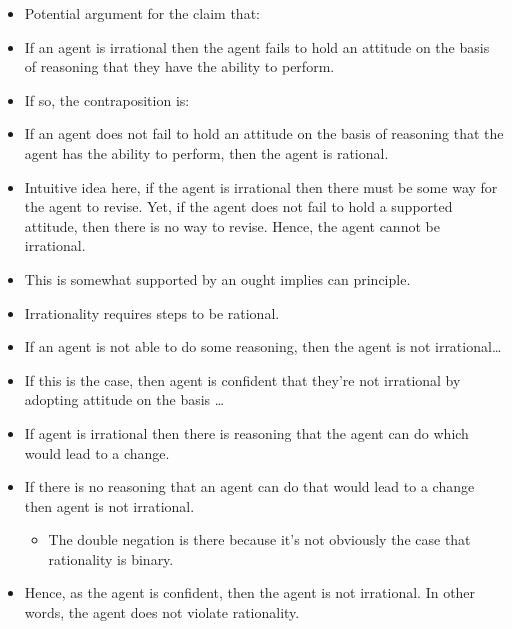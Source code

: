\documentclass[10pt]{article}
\begin{document}
\begin{itemize}
\item Potential argument for the claim that:
\item If an agent is irrational then the agent fails to hold an attitude on the basis of reasoning that they have the ability to perform.
\item If so, the contraposition is:
\item If an agent does not fail to hold an attitude on the basis of reasoning that the agent has the ability to perform, then the agent is rational.
\item Intuitive idea here, if the agent is irrational then there must be some way for the agent to revise.
  Yet, if the agent does not fail to hold a supported attitude, then there is no way to revise.
  Hence, the agent cannot be irrational.
\item This is somewhat supported by an ought implies can principle.
\item Irrationality requires steps to be rational.
\item If an agent is not able to do some reasoning, then the agent is not irrational\dots
\item If this is the case, then agent is confident that they're not irrational by adopting attitude on the basis \dots
\end{itemize}

\begin{itemize}
\item If agent is irrational then there is reasoning that the agent can do which would lead to a change.
\item If there is no reasoning that an agent can do that would lead to a change then agent is not irrational.
  \begin{itemize}
  \item The double negation is there because it's not obviously the case that rationality is binary.
  \end{itemize}
\item Hence, as the agent is confident, then the agent is not irrational.
  In other words, the agent does not violate rationality.
\end{itemize}
\end{document}
